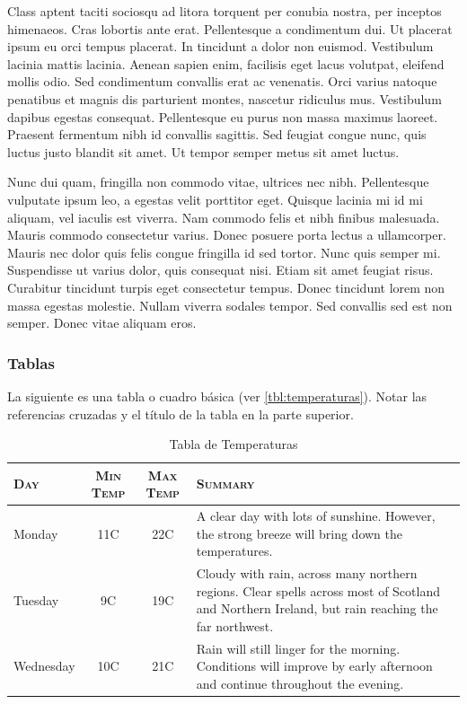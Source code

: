 Class aptent taciti sociosqu ad litora torquent per conubia nostra, per inceptos himenaeos. Cras lobortis ante erat. Pellentesque a condimentum dui. Ut placerat ipsum eu orci tempus placerat. In tincidunt a dolor non euismod. Vestibulum lacinia mattis lacinia. Aenean sapien enim, facilisis eget lacus volutpat, eleifend mollis odio. Sed condimentum convallis erat ac venenatis. Orci varius natoque penatibus et magnis dis parturient montes, nascetur ridiculus mus. Vestibulum dapibus egestas consequat. Pellentesque eu purus non massa maximus laoreet. Praesent fermentum nibh id convallis sagittis. Sed feugiat congue nunc, quis luctus justo blandit sit amet. Ut tempor semper metus sit amet luctus.

Nunc dui quam, fringilla non commodo vitae, ultrices nec nibh. Pellentesque vulputate ipsum leo, a egestas velit porttitor eget. Quisque lacinia mi id mi aliquam, vel iaculis est viverra. Nam commodo felis et nibh finibus malesuada. Mauris commodo consectetur varius. Donec posuere porta lectus a ullamcorper. Mauris nec dolor quis felis congue fringilla id sed tortor. Nunc quis semper mi. Suspendisse ut varius dolor, quis consequat nisi. Etiam sit amet feugiat risus. Curabitur tincidunt turpis eget consectetur tempus. Donec tincidunt lorem non massa egestas molestie. Nullam viverra sodales tempor. Sed convallis sed est non semper. Donec vitae aliquam eros. 


\subsubsection{Tablas}

La siguiente es una tabla o cuadro básica (ver \autoref{tbl:temperaturas}). Notar las referencias cruzadas y el título de la tabla en la parte superior.

\begin{table}[h!]
    \caption[Ejemplo: Tabla de Temperaturas]{Tabla de Temperaturas}
    \label{tbl:temperaturas}
    \begin{tabularx}{\linewidth}{@{} l  c  c  X @{}}
        \toprule
        \textbf{\textsc{Day}} &  \textbf{\textsc{Min Temp}} 
        		& \textbf{\textsc{Max Temp}} & \textbf{\textsc{Summary}}\\
    	  \hline\hline
        Monday & 11C & 22C & A clear day with lots of sunshine.
        However, the strong breeze will bring down the temperatures. \\ \hline
        Tuesday & 9C & 19C & Cloudy with rain, across many northern regions. Clear spells
        across most of Scotland and Northern Ireland,
        but rain reaching the far northwest. \\ \hline
        Wednesday & 10C & 21C & Rain will still linger for the morning.
        Conditions will improve by early afternoon and continue
        throughout the evening. \\
        \bottomrule
    \end{tabularx}
\end{table}

